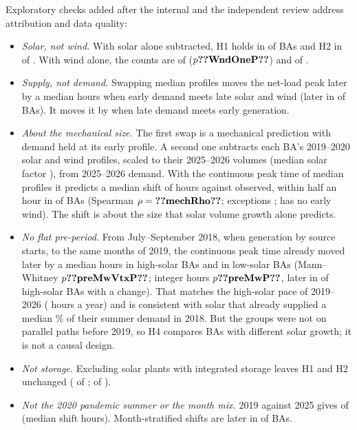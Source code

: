 \documentclass[conference,a4paper]{IEEEtran}
\begin{document}
Exploratory checks added after the internal and the independent review address attribution and data quality:
\begin{itemize}
\item \emph{Solar, not wind.} With solar alone subtracted, H1 holds in  of  BAs and H2 in  of . With wind alone, the counts are  of  ($p\res{WndOneP}$) and  of .
\item \emph{Supply, not demand.} Swapping median profiles moves the net-load peak later by a median  hours when early demand meets late solar and wind (later in  of  BAs). It moves it by  when late demand meets early generation.
\item \emph{About the mechanical size.} The first swap is a mechanical prediction with demand held at its early profile. A second one subtracts each BA's 2019--2020 solar and wind profiles, scaled to their 2025--2026 volumes (median solar factor ), from 2025--2026 demand. With the continuous peak time of median profiles it predicts a median shift of  hours against  observed, within half an hour in  of  BAs (Spearman $\rho=\res{mechRho}$; exceptions ;  has no early wind). The shift is about the size that solar volume growth alone predicts.
\item \emph{No flat pre-period.} From July--September 2018, when generation by source starts, to the same months of 2019, the continuous peak time already moved later by a median  hours in  high-solar BAs and  in  low-solar BAs (Mann--Whitney $p\res{preMwVtxP}$; integer hours $p\res{preMwP}$, later in  of  high-solar BAs with a change). That matches the high-solar pace of 2019--2026 ( hours a year) and is consistent with solar that already supplied a median \% of their summer demand in 2018. But the groups were not on parallel paths before 2019, so H4 compares BAs with different solar growth; it is not a causal design.
\item \emph{Not storage.} Excluding solar plants with integrated storage leaves H1 and H2 unchanged ( of ;  of ).
\item \emph{Not the 2020 pandemic summer or the month mix.} 2019 against 2025 gives  of  (median shift  hours). Month-stratified shifts are later in  of  BAs.

\end{itemize}
\end{document}
